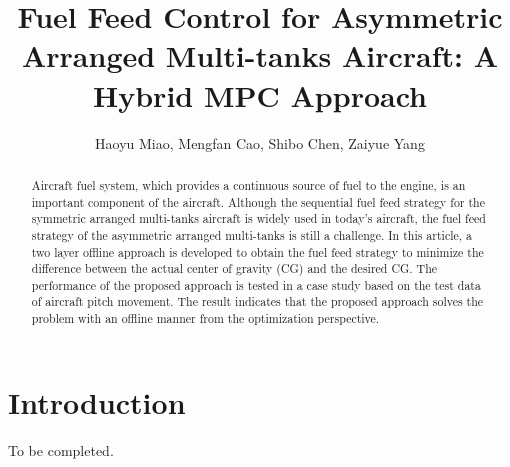 \documentclass[english]{cccconf}
\begin{document}
\title{Fuel Feed Control for Asymmetric Arranged Multi-tanks Aircraft: A Hybrid MPC Approach}

\author{Haoyu Miao,
        Mengfan Cao,
        Shibo Chen,
        Zaiyue Yang}


\maketitle

\begin{abstract}
Aircraft fuel system, which provides a continuous source of fuel to the engine, is an important component of the aircraft.
Although the sequential fuel feed strategy for the symmetric arranged multi-tanks aircraft is widely used in today's aircraft, the fuel feed strategy of the asymmetric arranged multi-tanks is still a challenge.
In this article, a two layer offline approach is developed to obtain the fuel feed strategy to minimize the difference between the actual center of gravity (CG) and the desired CG.
The performance of the proposed approach is tested in a case study based on the test data of aircraft pitch movement. 
The result indicates that the proposed approach solves the problem with an offline manner from the optimization perspective.

\end{abstract}



\section{Introduction}

To be completed.

\end{document}
